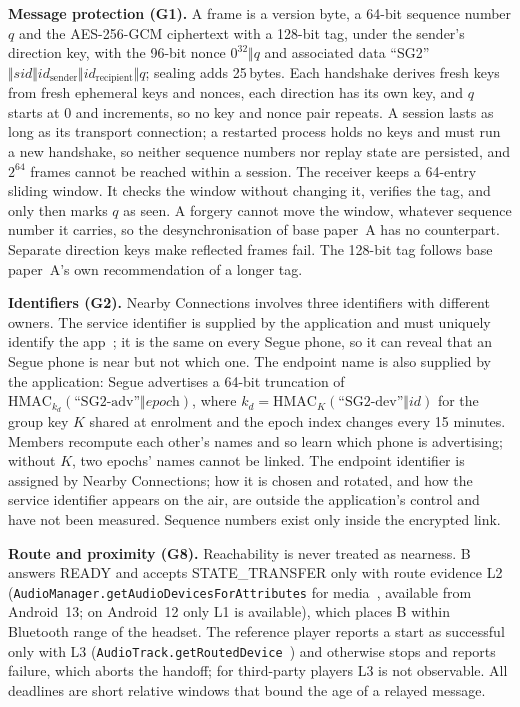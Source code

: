 \documentclass[conference]{IEEEtran}
\begin{document}
\textbf{Message protection (G1).} A frame is a version byte, a 64-bit sequence number $q$ and the AES-256-GCM ciphertext with a 128-bit tag, under the sender's direction key, with the 96-bit nonce $0^{32} \Vert q$ and associated data ``SG2''$\Vert sid \Vert \textit{id}_{\mathrm{sender}} \Vert \textit{id}_{\mathrm{recipient}} \Vert q$; sealing adds 25\,bytes. Each handshake derives fresh keys from fresh ephemeral keys and nonces, each direction has its own key, and $q$ starts at 0 and increments, so no key and nonce pair repeats. A session lasts as long as its transport connection; a restarted process holds no keys and must run a new handshake, so neither sequence numbers nor replay state are persisted, and $2^{64}$ frames cannot be reached within a session. The receiver keeps a 64-entry sliding window. It checks the window without changing it, verifies the tag, and only then marks $q$ as seen. A forgery cannot move the window, whatever sequence number it carries, so the desynchronisation of base paper~A has no counterpart. Separate direction keys make reflected frames fail. The 128-bit tag follows base paper~A's own recommendation of a longer tag.

\textbf{Identifiers (G2).} Nearby Connections involves three identifiers with different owners. The service identifier is supplied by the application and must uniquely identify the app~\cite{nearbydiscover}; it is the same on every Segue phone, so it can reveal that an Segue phone is near but not which one. The endpoint name is also supplied by the application: Segue advertises a 64-bit truncation of $\mathrm{HMAC}_{k_d}(\text{``SG2-adv''} \Vert \textit{epoch})$, where $k_d = \mathrm{HMAC}_{K}(\text{``SG2-dev''} \Vert \textit{id})$ for the group key $K$ shared at enrolment and the epoch index changes every 15 minutes. Members recompute each other's names and so learn which phone is advertising; without $K$, two epochs' names cannot be linked. The endpoint identifier is assigned by Nearby Connections; how it is chosen and rotated, and how the service identifier appears on the air, are outside the application's control and have not been measured. Sequence numbers exist only inside the encrypted link.

\textbf{Route and proximity (G8).} Reachability is never treated as nearness. B answers READY and accepts STATE\_TRANSFER only with route evidence L2 (\texttt{AudioManager.getAudioDevicesForAttributes} for media~\cite{androidaudiomanager}, available from Android~13; on Android~12 only L1 is available), which places B within Bluetooth range of the headset. The reference player reports a start as successful only with L3 (\texttt{AudioTrack.getRoutedDevice}~\cite{androidaudiotrack}) and otherwise stops and reports failure, which aborts the handoff; for third-party players L3 is not observable. All deadlines are short relative windows that bound the age of a relayed message.
\end{document}
